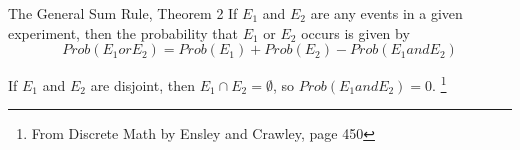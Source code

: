 \documentclass[a4paper,12pt]{book}
\newcounter{question}
\begin{document}
        \newpage
        \begin{intro}{The General Sum Rule, Theorem 2}
            If $E_1$ and $E_2$ are any events in a given experiment,
            then the probability that $E_1$ or $E_2$ occurs is given by
            $$ Prob(E_1 or E_2) = Prob(E_1) + Prob(E_2) - Prob(E_1 and E_2) $$

            If $E_1$ and $E_2$ are disjoint, then $E_1 \cap E_2 = \emptyset$,
            so $Prob(E_1 and E_2) = 0$.
            \footnote{From Discrete Math by Ensley and Crawley, page 450}
        \end{intro}

\end{document}

